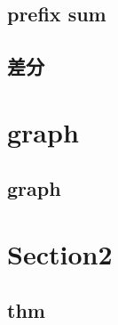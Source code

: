     \subsection{prefix sum}
        
    \subsection{差分}
        



\section{graph}
    \subsection{graph}
        


\section{Section2}
    \subsection{thm}
        